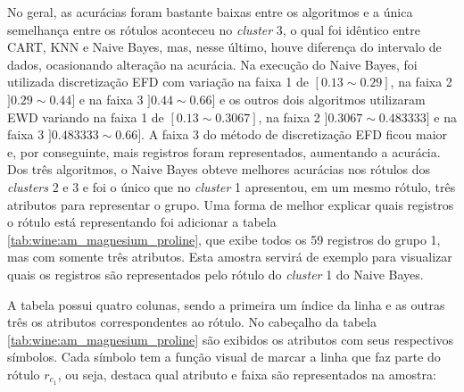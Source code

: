 No geral, as acurácias foram bastante baixas entre os algoritmos e a única semelhança entre os rótulos aconteceu no \textit{cluster} 3, o qual foi idêntico entre CART, KNN e Naive Bayes, mas, nesse último, houve diferença do intervalo de dados, ocasionando alteração na acurácia. Na execução do Naive Bayes, foi utilizada discretização EFD com variação na faixa 1 de ${[0.13 \sim 0.29]}$, na faixa 2 ${]0.29 \sim 0.44]}$ e na faixa 3 ${]0.44 \sim 0.66]}$ e os outros dois algoritmos utilizaram EWD variando na faixa 1 de ${[0.13 \sim 0.3067]}$, na faixa 2  ${]0.3067 \sim 0.483333]}$ e na faixa 3 ${]0.483333 \sim 0.66]}$. A faixa 3 do método de discretização EFD ficou maior e, por conseguinte, mais registros foram representados, aumentando a acurácia. Dos três algoritmos, o Naive Bayes obteve melhores acurácias nos rótulos dos \textit{clusters} 2 e 3 e foi o único que no \textit{cluster} 1 apresentou, em um mesmo rótulo, três atributos para representar o grupo. Uma forma de melhor explicar quais registros o rótulo está representando foi adicionar a tabela \ref{tab:wine:am_magnesium_proline}, que exibe todos os 59 registros do grupo 1, mas com somente três atributos. Esta amostra servirá de exemplo para visualizar quais os registros são representados pelo rótulo do \textit{cluster} 1 do Naive Bayes. 



A tabela possui quatro colunas, sendo a primeira um índice da linha e as outras três os atributos correspondentes ao rótulo. No cabeçalho da tabela \ref{tab:wine:am_magnesium_proline} são exibidos os atributos com seus respectivos símbolos. Cada símbolo tem a função visual de marcar a linha que faz parte do rótulo ${r_{c_1}}$, ou seja, destaca qual atributo e faixa são representados na amostra: 

